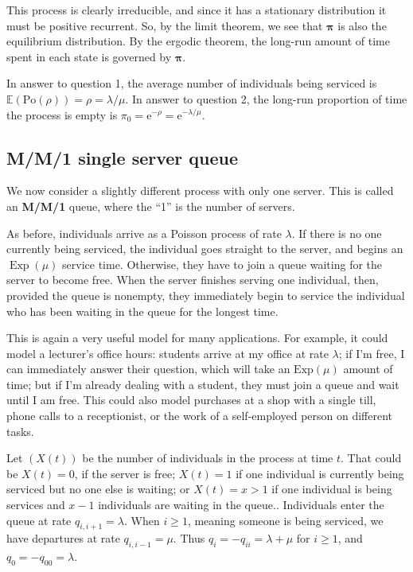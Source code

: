 \documentclass[
  a4paper,
]{article}
\theoremstyle{definition}
\theoremstyle{definition}
\theoremstyle{definition}
\theoremstyle{remark}
\begin{document}
This process is clearly irreducible, and since it has a stationary distribution it must be positive recurrent. So, by the limit theorem, we see that \(\boldsymbol\pi\) is also the equilibrium distribution. By the ergodic theorem, the long-run amount of time spent in each state is governed by \(\boldsymbol\pi\).

In answer to question 1, the average number of individuals being serviced is \(\mathbb E (\text{Po}(\rho)) = \rho = \lambda/\mu\). In answer to question 2, the long-run proportion of time the process is empty is \(\pi_0 = \mathrm{e}^{-\rho} = \mathrm{e}^{-\lambda/\mu}\).

\hypertarget{MM1}{%
\subsection{M/M/1 single server queue}\label{MM1}}

We now consider a slightly different process with only one server. This is called an \textbf{M/M/1} queue, where the ``1'' is the number of servers.

As before, individuals arrive as a Poisson process of rate \(\lambda\). If there is no one currently being serviced, the individual goes straight to the server, and begins an \(\operatorname{Exp}(\mu)\) service time. Otherwise, they have to join a queue waiting for the server to become free. When the server finishes serving one individual, then, provided the queue is nonempty, they immediately begin to service the individual who has been waiting in the queue for the longest time.

This is again a very useful model for many applications. For example, it could model a lecturer's office hours: students arrive at my office at rate \(\lambda\); if I'm free, I can immediately answer their question, which will take an \(\text{Exp}(\mu)\) amount of time; but if I'm already dealing with a student, they must join a queue and wait until I am free. This could also model purchases at a shop with a single till, phone calls to a receptionist, or the work of a self-employed person on different tasks.

Let \((X(t))\) be the number of individuals in the process at time \(t\). That could be \(X(t) = 0\), if the server is free; \(X(t) = 1\) if one individual is currently being serviced but no one else is waiting; or \(X(t) = x > 1\) if one individual is being services and \(x - 1\) individuals are waiting in the queue.. Individuals enter the queue at rate \(q_{i,i+1} = \lambda\). When \(i \geq 1\), meaning someone is being serviced, we have departures at rate \(q_{i,i-1} = \mu\). Thus \(q_i = -q_{ii} = \lambda + \mu\) for \(i \geq 1\), and \(q_0 = -q_{00} = \lambda\).
\end{document}
